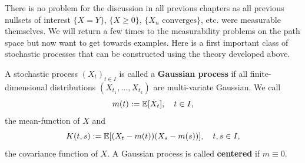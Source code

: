 There is no problem for the discussion in all previous chapters as all previous nullsets of interest $\{X=Y\}$, $\{X\geq 0\}$, $\{X_n \text{ converges}\}$, etc. were measurable themselves. We will return a few times to the measurability problems on the path space but now want to get towards examples. Here is a first important class of stochastic processes that can be constructed using the theory developed above.
\begin{ldef}
	\begin{deff}
		A stochastic process $(X_t)_{t\in I}$ is called a \textbf{Gaussian process} if all finite-dimensional distributions $(X_{t_1},...,X_{t_k})$ are multi-variate Gaussian. We call $$m(t):=\mathbb{E}[X_t],\quad t\in I,$$ the mean-function of $X$ and $$K(t,s):=\mathbb{E}[(X_t-m(t))(X_s-m(s))],\quad t,s\in I,$$ the covariance function of $X$. A Gaussian process is called \textbf{centered} if $m\equiv 0$.
	\end{deff}
\end{ldef}
